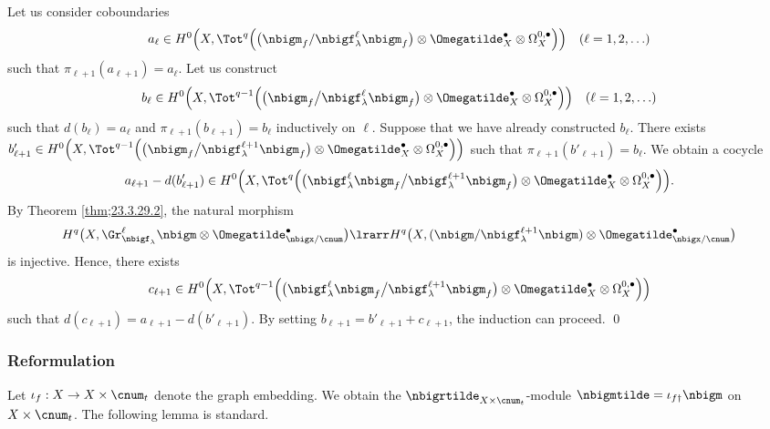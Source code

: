\documentclass[a4,10pt]{article}
\begin{document}
Let us consider coboundaries
\[
 a_{\ell}
 \in
 H^0\Bigl(
 X,\Tot^{q}\Bigl(
 \bigl(
 \nbigm_f/
 \nbigf_{\lambda}^{\ell}\nbigm_f
 \bigr)
 \otimes\Omegatilde^{\bullet}_X
 \otimes\Omega_X^{0,\bullet}
 \Bigr)
 \Bigr)
 \quad
 (\ell=1,2,\ldots)
\]
such that
$\pi_{\ell+1}(a_{\ell+1})=a_{\ell}$.
Let us construct
\[
 b_{\ell}
 \in
 H^0\Bigl(
 X,\Tot^{q-1}\Bigl(
\bigl(
 \nbigm_f
\big/
 \nbigf_{\lambda}^{\ell}\nbigm_f
 \bigr)
 \otimes\Omegatilde^{\bullet}_X
 \otimes\Omega_X^{0,\bullet}
 \Bigr)
 \Bigr)
  \quad
 (\ell=1,2,\ldots)
\]
such that
$d(b_{\ell})=a_{\ell}$
and
$\pi_{\ell+1}(b_{\ell+1})= b_{\ell}$
inductively on $\ell$.
Suppose that we have already constructed $b_{\ell}$.
There exists
$b'_{\ell+1}
 \in
 H^0\Bigl(
 X,\Tot^{q-1}\Bigl(
 \bigl(
 \nbigm_f
 \big/
 \nbigf_{\lambda}^{\ell+1}\nbigm_f
 \bigr)
 \otimes\Omegatilde^{\bullet}_X
 \otimes\Omega_X^{0,\bullet}
 \Bigr)
 \Bigr)$
such that $\pi_{\ell+1}(b'_{\ell+1})= b_{\ell}$.
We obtain a cocycle
\[
 a_{\ell+1}-d(b'_{\ell+1})
 \in
 H^0\Bigl(
 X,\Tot^{q}\Bigl(
\bigl(
 \nbigf_{\lambda}^{\ell}\nbigm_f\big/
 \nbigf_{\lambda}^{\ell+1}\nbigm_f
\bigr)
 \otimes\Omegatilde^{\bullet}_X
 \otimes\Omega_X^{0,\bullet}
 \Bigr)
 \Bigr).
\]
By Theorem \ref{thm;23.3.29.2}, the natural morphism
\[
 H^q\bigl(
 X,\Gr^{\ell}_{\nbigf_{\lambda}}\nbigm
 \otimes\Omegatilde_{\nbigx/\cnum}^{\bullet}
 \bigr)
 \lrarr
 H^q\bigl(
 X,(\nbigm/\nbigf_{\lambda}^{\ell+1}\nbigm)
 \otimes\Omegatilde_{\nbigx/\cnum}^{\bullet}
 \bigr)
\]
is injective.
Hence, there exists 
\[
 c_{\ell+1}
 \in
 H^0\Bigl(
 X,\Tot^{q-1}\Bigl(
\bigl(
 \nbigf_{\lambda}^{\ell}\nbigm_f\big/
 \nbigf_{\lambda}^{\ell+1}\nbigm_f
\bigr)
 \otimes\Omegatilde^{\bullet}_X
 \otimes\Omega_X^{0,\bullet}
 \Bigr)
 \Bigr)
\]
such that
$d(c_{\ell+1})=a_{\ell+1}-d(b'_{\ell+1})$.
By setting
$b_{\ell+1}=b'_{\ell+1}+c_{\ell+1}$,
the induction can proceed.
\hfill\qed

\subsubsection{Reformulation}

Let $\iota_f:X\to X\times\cnum_t$ denote the graph embedding.
We obtain
the $\nbigrtilde_{X\times\cnum_t}$-module
$\nbigmtilde=\iota_{f\dagger}\nbigm$ on $X\times\cnum_t$.
The following lemma is standard.
\end{document}
